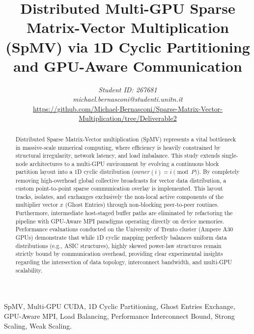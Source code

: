\documentclass[conference]{IEEEtran}
\begin{document}
\title{Distributed Multi-GPU Sparse Matrix-Vector Multiplication (SpMV) via 1D Cyclic Partitioning and GPU-Aware Communication}

\author{
\textit{Student ID: 267681}\\
\textit{michael.bernasconi@studenti.unitn.it} \\
\url{https://github.com/Michael-Bernasconi/Sparse-Matrix-Vector-Multiplication/tree/Deliverable2}
}

\maketitle

\begin{abstract}
Distributed Sparse Matrix-Vector multiplication (SpMV) represents a vital bottleneck in massive-scale numerical computing, where efficiency is heavily constrained by structural irregularity, network latency, and load imbalance. This study extends single-node architectures to a multi-GPU environment by evolving a continuous block partition layout into a 1D cyclic distribution ($owner(i) = i \pmod P$). By completely removing high-overhead global collective broadcasts for vector data distribution, a custom point-to-point sparse communication overlay is implemented. This layout tracks, isolates, and exchanges exclusively the non-local active components of the multiplier vector $x$ (Ghost Entries) through non-blocking peer-to-peer routines. Furthermore, intermediate host-staged buffer paths are eliminated by refactoring the pipeline with GPU-Aware MPI paradigms operating directly on device memories. Performance evaluations conducted on the University of Trento cluster (Ampere A30 GPUs) demonstrate that while 1D cyclic mapping perfectly balances uniform data distributions (e.g., ASIC structures), highly skewed power-law structures remain strictly bound by communication overhead, providing clear experimental insights regarding the intersection of data topology, interconnect bandwidth, and multi-GPU scalability.
\end{abstract}

\begin{IEEEkeywords}
SpMV, Multi-GPU CUDA, 1D Cyclic Partitioning, Ghost Entries Exchange, GPU-Aware MPI, Load Balancing, Performance Interconnect Bound, Strong Scaling, Weak Scaling.
\end{IEEEkeywords}
\end{document}
